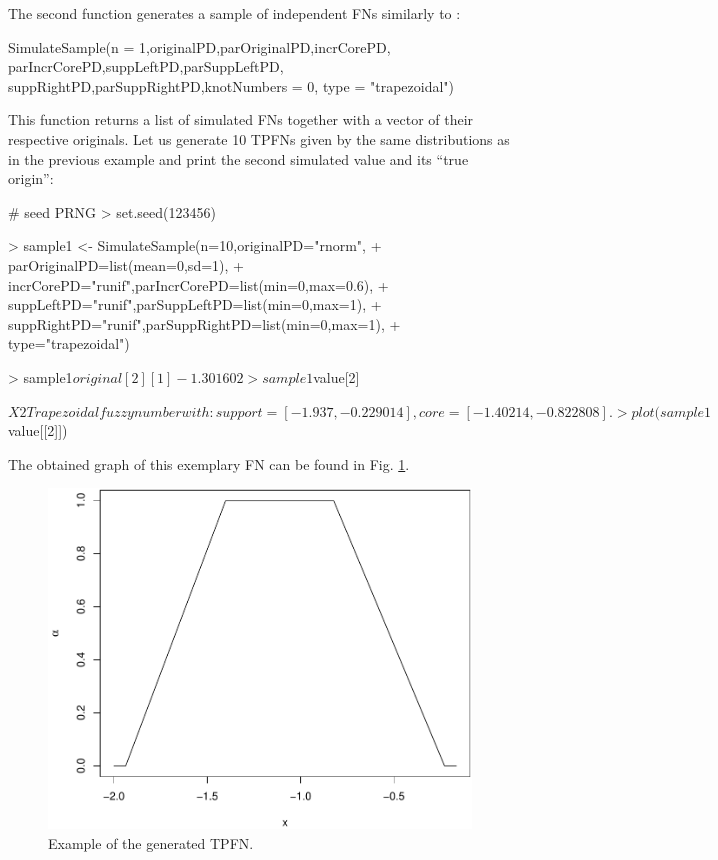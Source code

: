 The second function generates a sample of  independent FNs similarly to :
\begin{example}
SimulateSample(n = 1,originalPD,parOriginalPD,incrCorePD,
  parIncrCorePD,suppLeftPD,parSuppLeftPD,
  suppRightPD,parSuppRightPD,knotNumbers = 0,
  type = "trapezoidal")
\end{example}
This function returns a list of simulated FNs together with a vector of their respective originals.
Let us generate 10 TPFNs given by the same distributions as in the previous example and print the second simulated value and its ``true origin'':
\begin{example}
# seed PRNG
> set.seed(123456)

> sample1 <- SimulateSample(n=10,originalPD="rnorm",
+  parOriginalPD=list(mean=0,sd=1),
+  incrCorePD="runif",parIncrCorePD=list(min=0,max=0.6),
+  suppLeftPD="runif",parSuppLeftPD=list(min=0,max=1),
+  suppRightPD="runif",parSuppRightPD=list(min=0,max=1),
+  type="trapezoidal")

> sample1$original[2]

[1] -1.301602

> sample1$value[2]

$X2
Trapezoidal fuzzy number with:
   support=[-1.937,-0.229014],
      core=[-1.40214,-0.822808].

> plot(sample1$value[[2]])
\end{example}

The obtained graph of this exemplary FN can be found in Fig. \ref{figFN1}.

\begin{figure}[htb]
  \centering
	\includegraphics[scale=0.45]{fuzzy_number_rys1.pdf}
	\caption{Example of the generated TPFN.}
	\label{figFN1}
\end{figure}


